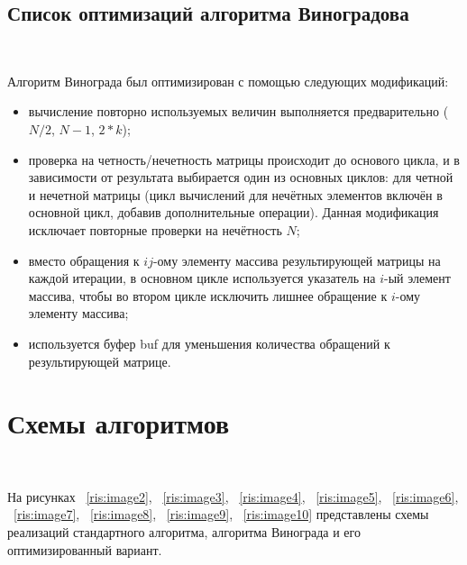 \documentclass[12pt]{report}
\begin{document}
	\subsection{Список оптимизаций алгоритма Виноградова}
	
	~\
	
	Алгоритм Винограда был оптимизирован с помощью следующих модификаций:
	\begin{itemize}
		\item вычисление повторно используемых величин выполняется предварительно ($N / 2$, $N - 1$, $2 * k$);
		\item проверка на четность/нечетность матрицы происходит до основого цикла, и в зависимости от результата выбирается один из основных циклов: для четной и нечетной матрицы (цикл вычислений для нечётных элементов включён в основной цикл, добавив дополнительные операции). Данная модификация исключает повторные проверки на нечётность $N$;
		\item вместо обращения к $ij$-ому элементу массива результирующей матрицы на каждой итерации, в основном цикле используется указатель на $i$-ый элемент массива, чтобы во втором цикле исключить лишнее обращение к $i$-ому элементу массива;
		\item используется буфер buf для уменьшения количества обращений к результирующей матрице.
	\end{itemize}

	\section{Схемы алгоритмов}
	
	~\
	
	На рисунках ~\ref{ris:image2}, ~\ref{ris:image3}, ~\ref{ris:image4}, ~\ref{ris:image5}, ~\ref{ris:image6}, ~\ref{ris:image7}, ~\ref{ris:image8}, ~\ref{ris:image9}, ~\ref{ris:image10} представлены схемы реализаций стандартного алгоритма, алгоритма Винограда и его оптимизированный вариант.
	
\end{document}
